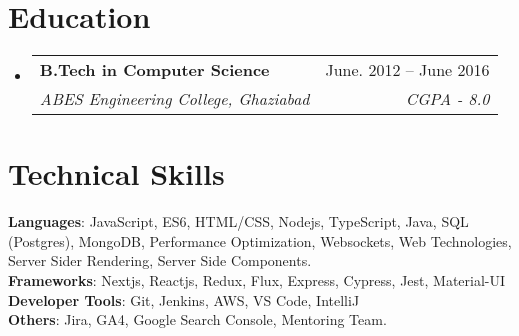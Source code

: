 \documentclass[letterpaper,11pt]{article}
\makeatletter
\newcommand{\resumeSubheading}[4]{
  \vspace{-2pt}\item
    \begin{tabular*}{0.97\textwidth}[t]{l@{\extracolsep{\fill}}r}
      \textbf{#1} & #2 \\
      \textit{\small#3} & \textit{\small #4} \\
    \end{tabular*}\vspace{-7pt}
}
\newcommand{\resumeSubHeadingListStart}{\begin{itemize}[leftmargin=0.15in, label={}]}
\newcommand{\resumeSubHeadingListEnd}{\end{itemize}}
\makeatother
\begin{document}
\section{Education}
  \resumeSubHeadingListStart
    \resumeSubheading
      {B.Tech in Computer Science}{June. 2012 -- June 2016}
      {ABES Engineering College, Ghaziabad}{CGPA - 8.0}
  \resumeSubHeadingListEnd


\section{Technical Skills}
 \begin{itemize}[leftmargin=0.15in, label={}]
    \small{\item{
     \textbf{Languages}{: JavaScript, ES6, HTML/CSS, Nodejs, TypeScript, Java, SQL (Postgres), MongoDB, Performance Optimization, Websockets, Web Technologies, Server Sider Rendering, Server Side Components.} \\
     \textbf{Frameworks}{: Nextjs, Reactjs, Redux, Flux, Express, Cypress, Jest, Material-UI} \\
     \textbf{Developer Tools}{: Git, Jenkins, AWS, VS Code, IntelliJ} \\
     \textbf{Others}{: Jira, GA4, Google Search Console, Mentoring Team.} \\
    }}
 \end{itemize}


\end{document}
